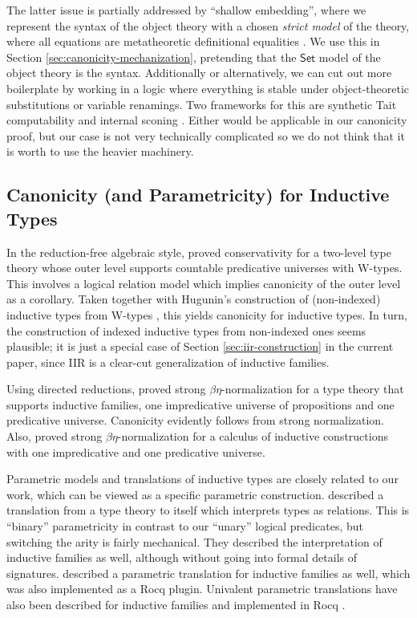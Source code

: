 \documentclass[acmsmall,screen,review]{acmart}
\newcommand{\msf}[1]{{\mathsf{#1}}}
\newcommand{\Set}{\msf{Set}}
\begin{document}
The latter issue is partially addressed by ``shallow embedding'', where we represent the syntax of
the object theory with a chosen \emph{strict model} of the theory, where all equations are
metatheoretic definitional equalities \cite{DBLP:conf/mpc/KaposiKK19}. We use this in Section
\ref{sec:canonicity-mechanization}, pretending that the $\Set$ model of the object theory is the
syntax. Additionally or alternatively, we can cut out more boilerplate by working in a logic where
everything is stable under object-theoretic substitutions or variable renamings. Two frameworks for
this are synthetic Tait computability \cite{sterlingthesis} and internal sconing
\cite{DBLP:conf/fscd/BocquetKS23}. Either would be applicable in our canonicity proof, but our case
is not very technically complicated so we do not think that it is worth to use the heavier machinery.

\subsection{Canonicity (and Parametricity) for Inductive Types}

In the reduction-free algebraic style, \citet{DBLP:journals/pacmpl/Kovacs24} proved conservativity
for a two-level type theory whose outer level supports countable predicative universes with
W-types. This involves a logical relation model which implies canonicity of the outer level as a
corollary. Taken together with Hugunin's construction of (non-indexed) inductive types from W-types
\cite{whynotw}, this yields canonicity for inductive types. In turn, the construction of
indexed inductive types from non-indexed ones seems plausible; it is just a special case of
Section \ref{sec:iir-construction} in the current paper, since IIR is a clear-cut generalization
of inductive families.

Using directed reductions, \citet{DBLP:phd/ethos/Goguen94} proved strong $\beta\eta$-normalization
for a type theory that supports inductive families, one impredicative universe of propositions and one
predicative universe. Canonicity evidently follows from strong normalization. Also,
\cite{DBLP:phd/hal/Werner94} proved strong $\beta\eta$-normalization for a calculus of inductive
constructions with one impredicative and one predicative universe.

Parametric models and translations of inductive types are closely related to our work, which can be
viewed as a specific parametric construction. \citet{bernardy12parametricity} described a
translation from a type theory to itself which interprets types as relations. This is ``binary''
parametricity in contrast to our ``unary'' logical predicates, but switching the arity is fairly
mechanical. They described the interpretation of inductive families as well, although without going
into formal details of signatures. \citet{pedrot2018failure} described a parametric translation for
inductive families as well, which was also implemented as a Rocq plugin. Univalent parametric
translations have also been described for inductive families and implemented in Rocq
\cite{tabareau2018equivalences,tabareau2021marriage,cohen2024trocq}.
\end{document}
